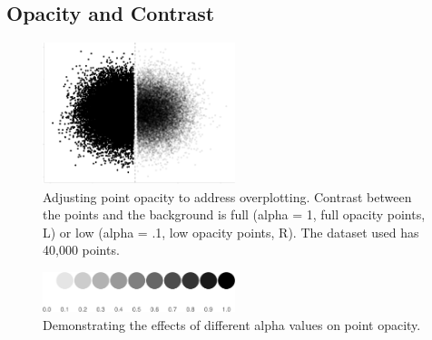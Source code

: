 \documentclass[sigconf]{acmart}
\begin{document}
\hypertarget{sec-transparency-and-contrast}{%
\subsection{Opacity and Contrast}\label{sec-transparency-and-contrast}}

\begin{figure}

\includegraphics[width=0.5\textwidth,height=\textheight]{size_and_opacity_files/figure-pdf/fig-overplotting-examples-1.pdf} \hfill{}

\caption{\label{fig-overplotting-examples}Adjusting point opacity to
address overplotting. Contrast between the points and the background is
full (alpha = 1, full opacity points, L) or low (alpha = .1, low opacity
points, R). The dataset used has 40,000 points.}

\end{figure}

\begin{figure}

\includegraphics[width=0.5\textwidth,height=\textheight]{size_and_opacity_files/figure-pdf/fig-alpha-examples-1.pdf} \hfill{}

\caption{\label{fig-alpha-examples}Demonstrating the effects of
different alpha values on point opacity.}

\end{figure}
\end{document}

